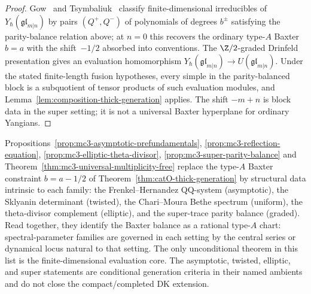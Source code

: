 \begin{proof}
Gow~\cite{Gow07} and Tsymbaliuk~\cite{Tsymbaliuk20super}
classify finite-dimensional irreducibles of
$Y_\hbar(\mathfrak{gl}_{m|n})$ by pairs $(Q^+, Q^-)$ of
polynomials of degrees $b^\pm$ satisfying the parity-balance
relation above; at $n = 0$ this recovers the ordinary
type-$A$ Baxter $b = a$ with the shift~$-1/2$ absorbed into
conventions. The $\Z/2$-graded Drinfeld presentation gives
an evaluation homomorphism $Y_\hbar(\mathfrak{gl}_{m|n}) \to
U(\mathfrak{gl}_{m|n})$. Under the stated finite-length fusion
hypotheses, every simple in the parity-balanced block is a
subquotient of tensor products of such evaluation modules, and
Lemma~\ref{lem:composition-thick-generation} applies. The shift
$-m+n$ is block data in the super setting; it is not a universal
Baxter hyperplane for ordinary Yangians.
\end{proof}

\begin{remark}
\label{rem:mc3-unified-mechanism}
Propositions~\ref{prop:mc3-asymptotic-prefundamentals},
\ref{prop:mc3-reflection-equation},
\ref{prop:mc3-elliptic-theta-divisor},
\ref{prop:mc3-super-parity-balance} and
Theorem~\ref{thm:mc3-universal-multiplicity-free}
replace the type-$A$ Baxter constraint
$b = a - 1/2$ of
Theorem~\ref{thm:catO-thick-generation} by structural data
intrinsic to each family: the Frenkel--Hernandez QQ-system
(asymptotic), the Sklyanin determinant (twisted), the
Chari--Moura Bethe spectrum (uniform), the theta-divisor
complement (elliptic), and the super-trace parity balance
(graded). Read together, they identify the Baxter balance as a
rational type-$A$ chart: spectral-parameter families are governed in
each setting by the central series or dynamical locus natural to that
setting. The only unconditional theorem in this list is the
finite-dimensional evaluation core. The asymptotic, twisted, elliptic,
and super statements are conditional generation criteria in their
named ambients and do not close the compact/completed DK extension.
\end{remark}

